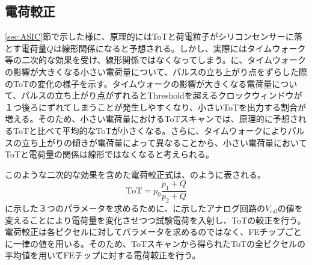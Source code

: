 \subsection{電荷較正}
\label{sec:calibration}
\ref{sec:ASIC}節で示した様に、原理的にはToTと荷電粒子がシリコンセンサーに落とす電荷量$Q$は線形関係になると予想される。しかし、実際にはタイムウォーク等の二次的な効果を受け、線形関係ではなくなってしまう。に、タイムウォークの影響が大きくなる小さい電荷量について、パルスの立ち上がり点をずらした際のToTの変化の様子を示す。タイムウォークの影響が大きくなる電荷量について、パルスの立ち上がり点がずれるとThresholdを超えるクロックウィンドウが１つ後ろにずれてしまうことが発生しやすくなり、小さいToTを出力する割合が増える。そのため、小さい電荷量におけるToTスキャンでは、原理的に予想されるToTと比べて平均的なToTが小さくなる。さらに、タイムウォークによりパルスの立ち上がりの傾きが電荷量によって異なることから、小さい電荷量においてToTと電荷量の関係は線形ではなくなると考えられる。

このような二次的な効果を含めた電荷較正式は、のように表される。
\begin{equation}
  \label{eq:calibration}
  \mathrm{ToT} = p_0\frac{p_1 + Q}{p_2 + Q}
\end{equation}
に示した３つのパラメータを求めるために、に示したアナログ回路の$V_\mathrm{cal}$の値を変えることにより電荷量を変化させつつ試験電荷を入射し、ToTの較正を行う。電荷較正は各ピクセルに対してパラメータを求めるのではなく、FEチップごとに一律の値を用いる。そのため、ToTスキャンから得られたToTの全ピクセルの平均値を用いてFEチップに対する電荷較正を行う。


